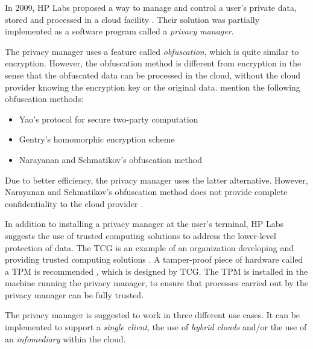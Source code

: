 \documentclass[pdftex,english,10pt,b5paper,twoside]{book}
\begin{document}
In 2009, HP Labs proposed a way to manage and control a user's private data,
stored and processed in a cloud facility \cite{privacymanager}. Their solution
was partially implemented as a software program called a \emph{privacy manager}.

The privacy manager uses a feature called \emph{obfuscation}, which is quite
similar to encryption. However, the obfuscation method is different from
encryption in the sense that the obfuscated data can be processed in the
cloud, without the cloud provider knowing the encryption key or the original
data. \citet{privacymanager} mention the following obfuscation methods:

\begin{itemize}
\item Yao's protocol for secure two-party computation \cite{yao}
\item Gentry's homomorphic encryption scheme \cite{gentry}
\item Narayanan and Schmatikov's obfuscation method \cite{obfuscationmethod}
\end{itemize}

Due to better efficiency, the privacy manager uses the latter alternative. However,
Narayanan and Schmatikov's obfuscation method does not provide complete
confidentiality to the cloud provider \cite{obfuscationmethod}.

In addition to installing a privacy manager at the user's terminal, HP Labs
suggests the use of trusted computing solutions to address the lower-level
protection of data. The \ac{TCG} is an example of an organization developing
and providing trusted computing solutions \cite{tcg}. A tamper-proof piece of
hardware called a \ac{TPM} is recommended \cite{privacymanager}, which is
designed by \ac{TCG}. The \ac{TPM} is installed in the machine running the
privacy manager, to ensure that processes carried out by the privacy manager can
be fully trusted.

The privacy manager is suggested to work in three different use cases. It can
be implemented to support a \emph{single client}, the use of \emph{hybrid
clouds} and/or the use of an \emph{infomediary} within the cloud.

\end{document}
